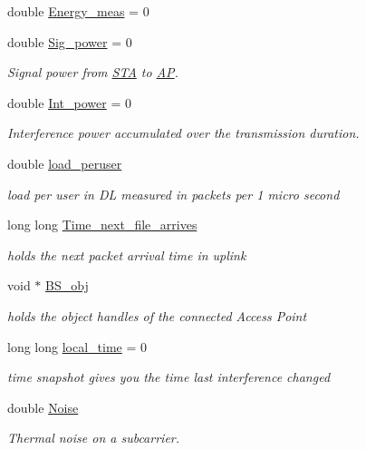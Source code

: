 \begin{DoxyCompactItemize}
double \hyperlink{classSTA_a3d52251caf1e4b973bf795dcf8c2fafa}{Energy\-\_\-meas} = 0
\item 
double \hyperlink{classSTA_aed9adbb07ca59c2efa1470e76180331c}{Sig\-\_\-power} = 0
\begin{DoxyCompactList}\small\item\em Signal power from \hyperlink{classSTA}{S\-T\-A} to \hyperlink{classAP}{A\-P}. \end{DoxyCompactList}\item 
double \hyperlink{classSTA_aa1e60f7391861b468314437fbad67280}{Int\-\_\-power} = 0
\begin{DoxyCompactList}\small\item\em Interference power accumulated over the transmission duration. \end{DoxyCompactList}\item 
double \hyperlink{classSTA_ab95904d5e62ea7cfe15488e8a2d7b56e}{load\-\_\-peruser}
\begin{DoxyCompactList}\small\item\em load per user in D\-L measured in packets per 1 micro second \end{DoxyCompactList}\item 
long long \hyperlink{classSTA_ad7653686912b61e311486017049c3612}{Time\-\_\-next\-\_\-file\-\_\-arrives}
\begin{DoxyCompactList}\small\item\em holds the next packet arrival time in uplink \end{DoxyCompactList}\item 
void $\ast$ \hyperlink{classSTA_abfa329ed1a4539a0f88ef568f41aaac9}{B\-S\-\_\-obj}
\begin{DoxyCompactList}\small\item\em holds the object handles of the connected Access Point \end{DoxyCompactList}\item 
long long \hyperlink{classSTA_ad4800b03ee83fe283cc33089eb438359}{local\-\_\-time} = 0
\begin{DoxyCompactList}\small\item\em time snapshot gives you the time last interference changed \end{DoxyCompactList}\item 
double \hyperlink{classSTA_ae9a319d9b58f28610defc9e0fc51aa60}{Noise}
\begin{DoxyCompactList}\small\item\em Thermal noise on a subcarrier. \end{DoxyCompactList}\item 

\end{DoxyCompactItemize}
